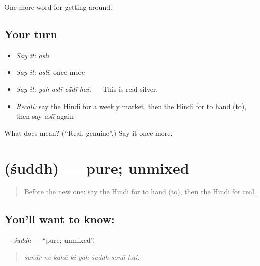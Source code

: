 \begin{grammarlens}[title={What you've built}]
One more word for getting around.
\end{grammarlens}

\subsection*{Your turn}
\begin{itemize}
\raggedright
  \item \emph{Say it:} \emph{aslī}
  \item \emph{Say it:} \emph{aslī}, once more
  \item \emph{Say it:} \emph{yah aslī cā̃dī hai.} — This is real silver.
  \item \emph{Recall:} say the Hindi for a weekly market, then the Hindi for to hand (to), then say \emph{aslī} again
\end{itemize}

\begin{tcolorbox}[breakable,colback=teal!4,colframe=teal!35!black,title={Before you move on}]
What does  mean? (\textquotedblleft{}Real, genuine\textquotedblright{}.) Say it once more.
\end{tcolorbox}
\section[\texorpdfstring{\hi{शुद्ध} (śuddh)}{शुद्ध (śuddh)}]{ (śuddh) — pure; unmixed}

\label{lesson:HI-C434-suddh}



\begin{quote}
Before the new one: say the Hindi for to hand (to), then the Hindi for real.
\end{quote}

\subsection*{You'll want to know: }
\textbf{} — \emph{śuddh} — \textquotedblleft{}pure; unmixed\textquotedblright{}.

\begin{quote}
       
\end{quote}

\begin{quote}
\emph{sunār ne kahā ki yah śuddh sonā hai.}
\end{quote}

